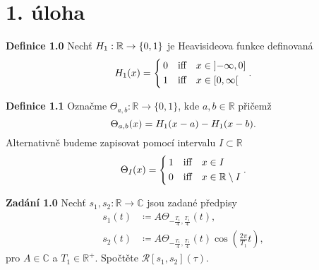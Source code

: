 \documentclass{article}
\begin{document}
\section*{1. úloha}

\noindent \textbf{Definice 1.0} Nechť $\mathnormal{H}_1: \mathbb{R} \to \{0, 1\}$ je Heavisideova funkce definovaná
\[
    \mathnormal{H}_1(x) = 
    \begin{dcases}
        \,0 & \text{iff}\quad x \in \left]-\infty, 0 \right] \\
        \,1 & \text{iff}\quad x \in \left[0,\infty \right[ \\
    \end{dcases}
    .
\]

\vspace{0.5em}
\noindent \textbf{Definice 1.1} Označme $\Theta_{a, b}: \mathbb{R} \to \{0, 1\}$, kde  $a,b \in \mathbb{R}$ přičemž
\[
    \Theta_{a, b}(x) = \mathnormal{H}_1(x-a) - \mathnormal{H}_1(x-b).
\]
Alternativně budeme zapisovat pomocí intervalu $I\subset\mathbb{R}$
\[
    \Theta_I(x) = 
    \begin{dcases}
        \,1 & \text{iff}\quad x \in I \\
        \,0 & \text{iff}\quad x \in \mathbb{R}\setminus I \\
    \end{dcases}.
\]

\vspace{0.5em}
\noindent \textbf{Zadání 1.0} Nechť $s_1, s_2: \mathbb{R} \to \mathbb{C}$ jsou zadané předpisy
\begin{align*}
    s_1(t) &\coloneqq A \Theta_{-\frac{T_1}{4}, \frac{T_1}{4}}(t), \\
    s_2(t) &\coloneqq A \Theta_{-\frac{T_1}{4}, \frac{T_1}{4}}(t) \cos\left(\frac{2\pi}{T_1}t\right),
\end{align*}
pro $A \in \mathbb{C}$ a $T_1\in \mathbb{R^{+}}$. Spočtěte  $\mathcal{R}[s_1, s_2](\tau)$.
\vspace{0.5em}
\end{document}
